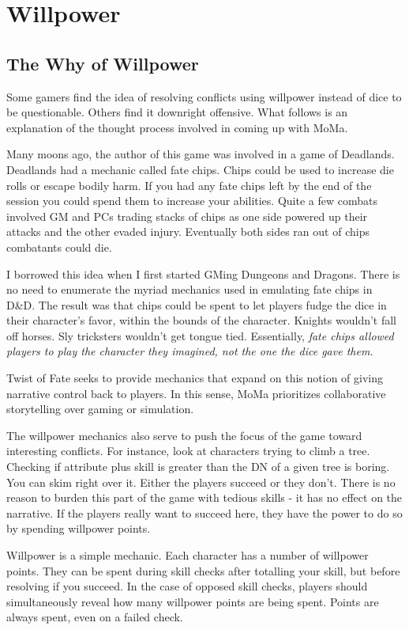 \documentclass[twocolumn]{report}
\begin{document}
\newpage
\section{Willpower}

\subsection*{The Why of Willpower} 
Some gamers find the idea of resolving conflicts using willpower instead of dice to be questionable.  Others find it downright offensive.  What follows is an explanation of the thought process involved in coming up with MoMa.

Many moons ago, the author of this game was involved in a game of Deadlands.  Deadlands had a mechanic called fate chips.  Chips could be used to increase die rolls or escape bodily harm.  If you had any fate chips left by the end of the session you could spend them to increase your abilities.  Quite a few combats involved GM and PCs trading stacks of chips as one side powered up their attacks and the other evaded injury.  Eventually both sides ran out of chips combatants could die. 

I borrowed this idea when I first started GMing Dungeons and Dragons.  There is no need to enumerate the myriad mechanics used in emulating fate chips in D\&D.  The result was that chips could be spent to let players fudge the dice in their character's favor, within the bounds of the character.  Knights wouldn't fall off horses.  Sly tricksters wouldn't get tongue tied.  Essentially, \emph{fate chips allowed players to play the character they imagined, not the one the dice gave them.}

Twist of Fate seeks to provide mechanics that expand on this notion of giving narrative control back to players.  In this sense, MoMa prioritizes collaborative storytelling over gaming or simulation.

The willpower mechanics also serve to push the focus of the game toward interesting conflicts.  For instance, look at characters trying to climb a tree.  Checking if attribute plus skill is greater than the DN of a given tree is boring.  You can skim right over it.  Either the players succeed or they don't.  There is no reason to burden this part of the game with tedious skills - it has no effect on the narrative.  If the players really want to succeed here, they have the power to do so by spending willpower points.  

Willpower is a simple mechanic.  Each character has a number of willpower points.  They can be spent during skill checks after totalling your skill, but before resolving if you succeed.  In the case of opposed skill checks, players should simultaneously reveal how many willpower points are being spent.  Points are always spent, even on a failed check.
\end{document}
